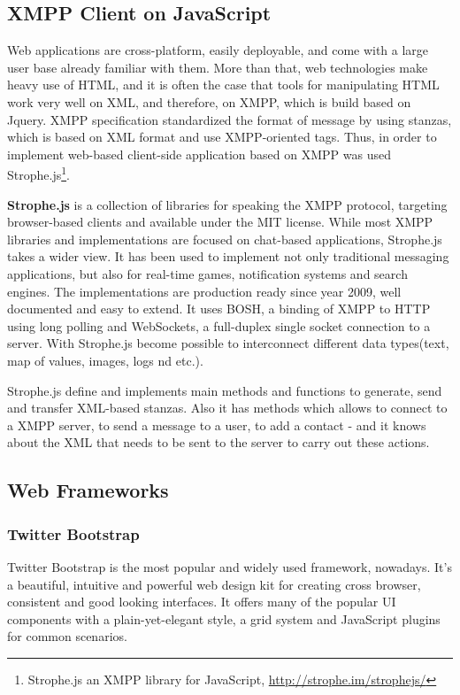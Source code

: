     \subsection{XMPP Client on JavaScript}

	Web applications are cross-platform, easily deployable, and come with a large user base already familiar with them. More than that, web technologies make heavy use of HTML, and it is often the case that tools for manipulating HTML work very well on XML, and therefore, on XMPP, which is build based on Jquery. XMPP specification standardized the format of message by using stanzas, which is based on XML format and use XMPP-oriented tags. Thus, in order to implement web-based client-side application based on XMPP was used Strophe.js\footnote{Strophe.js an XMPP library for JavaScript, \url{http://strophe.im/strophejs/}}.

    \textbf{Strophe.js} is a collection of libraries for speaking the XMPP protocol, targeting browser-based clients and available under the MIT license. While most XMPP libraries and implementations are focused on chat-based applications, Strophe.js takes a wider view. It has been used to implement not only traditional messaging applications, but also for real-time games, notification systems and search engines. The implementations are production ready since year 2009, well documented and easy to extend. It uses BOSH, a binding of XMPP to HTTP using long polling and WebSockets, a full-duplex single socket connection to a server. With Strophe.js become possible to interconnect different data types(text, map of values, images, logs nd etc.).

    Strophe.js define and implements main methods and functions to generate, send and transfer XML-based stanzas. Also it has methods which allows to connect to a XMPP server, to send a message to a user, to add a contact - and it knows about the XML that needs to be sent to the server to carry out these actions. 

\subsection{Web Frameworks}
   \subsubsection{Twitter Bootstrap}
	Twitter Bootstrap is the most popular and widely used framework, nowadays. It's a beautiful, intuitive and powerful web design kit for creating cross browser, consistent and good looking interfaces. It offers many of the popular UI components with a plain-yet-elegant style, a grid system and JavaScript plugins for common scenarios.

